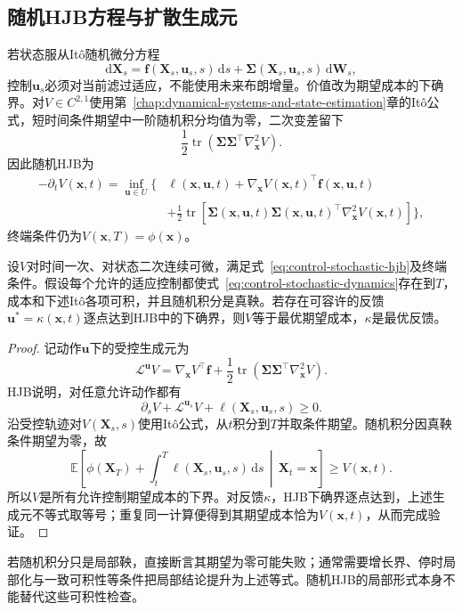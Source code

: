 \subsection{随机HJB方程与扩散生成元}
若状态服从Itô随机微分方程
\begin{equation}
  \mathrm{d}\bm{X}_s
  =
  \bm{f}(\bm{X}_s,\bm{u}_s,s)\,\mathrm{d}s
  +
  \bm{\Sigma}(\bm{X}_s,\bm{u}_s,s)\,
  \mathrm{d}\bm{W}_s,
  \label{eq:control-stochastic-dynamics}
\end{equation}
控制$\bm{u}_s$必须对当前滤过适应，不能使用未来布朗增量。价值改为期望成本的下确界。对$V\in C^{2,1}$使用第~\ref{chap:dynamical-systems-and-state-estimation}章的Itô公式，短时间条件期望中一阶随机积分均值为零，二次变差留下
\[
  \frac12
  \operatorname{tr}
  \left(
    \bm{\Sigma}\bm{\Sigma}^{\top}
    \nabla_{\bm{x}}^2V
  \right).
\]
因此随机HJB为
\begin{equation}
  \begin{aligned}
  -\partial_tV(\bm{x},t)
  =
  \inf_{\bm{u}\in U}
  \biggl\{&
    \ell(\bm{x},\bm{u},t)
    +
    \nabla_{\bm{x}}V(\bm{x},t)^{\top}
    \bm{f}(\bm{x},\bm{u},t)\\
    &+
    \frac12
    \operatorname{tr}
    \left[
      \bm{\Sigma}(\bm{x},\bm{u},t)
      \bm{\Sigma}(\bm{x},\bm{u},t)^{\top}
      \nabla_{\bm{x}}^2V(\bm{x},t)
    \right]
  \biggr\},
  \end{aligned}
  \label{eq:control-stochastic-hjb}
\end{equation}
终端条件仍为$V(\bm{x},T)=\phi(\bm{x})$。

\begin{theorem}[随机HJB验证]
\label{thm:control-stochastic-hjb-verification}
设$V$对时间一次、对状态二次连续可微，满足式~\eqref{eq:control-stochastic-hjb}及终端条件。假设每个允许的适应控制都使式~\eqref{eq:control-stochastic-dynamics}存在到$T$，成本和下述Itô各项可积，并且随机积分是真鞅。若存在可容许的反馈$\bm{u}^{\ast}=\kappa(\bm{x},t)$逐点达到HJB中的下确界，则$V$等于最优期望成本，$\kappa$是最优反馈。
\end{theorem}
\begin{proof}
记动作$\bm{u}$下的受控生成元为
\[
  \mathcal{L}^{\bm{u}}V
  =
  \nabla_{\bm{x}}V^{\top}\bm{f}
  +
  \frac12
  \operatorname{tr}
  \left(
    \bm{\Sigma}\bm{\Sigma}^{\top}
    \nabla_{\bm{x}}^2V
  \right).
\]
HJB说明，对任意允许动作都有
\[
  \partial_sV+\mathcal{L}^{\bm{u}_s}V
  +\ell(\bm{X}_s,\bm{u}_s,s)\geq0.
\]
沿受控轨迹对$V(\bm{X}_s,s)$使用Itô公式，从$t$积分到$T$并取条件期望。随机积分因真鞅条件期望为零，故
\[
  \mathbb{E}\left[
    \phi(\bm{X}_T)
    +
    \int_t^T
      \ell(\bm{X}_s,\bm{u}_s,s)\,\mathrm{d}s
    \,\middle|\,\bm{X}_t=\bm{x}
  \right]
  \geq V(\bm{x},t).
\]
所以$V$是所有允许控制期望成本的下界。对反馈$\kappa$，HJB下确界逐点达到，上述生成元不等式取等号；重复同一计算便得到其期望成本恰为$V(\bm{x},t)$，从而完成验证。
\end{proof}
若随机积分只是局部鞅，直接断言其期望为零可能失败；通常需要增长界、停时局部化与一致可积性等条件把局部结论提升为上述等式。随机HJB的局部形式本身不能替代这些可积性检查。

